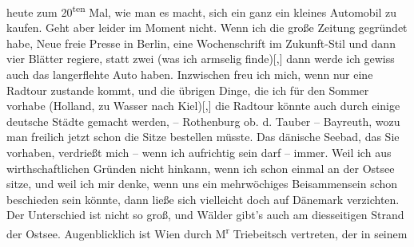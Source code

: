 \begin{ledgroupsized}[t]{13cm}
               heute zum 20\textsuperscript{ten} Mal, wie man es macht, sich ein ganz ein
               kleines Automobil zu kaufen. Geht aber leider im Moment nicht. Wenn ich die große
               Zeitung gegründet habe, Neue freie Presse in Berlin, eine Wochenschrift im Zukunft-Stil und dann vier Blätter regiere, statt zwei (was
               ich armselig finde){[},{]} dann werde ich gewiss auch das langerflehte
               Auto haben. Inzwischen freu ich mich, wenn nur eine Radtour zustande kommt, und die
               übrigen Dinge, die ich für den Sommer vorhabe (Holland, zu Wasser nach Kiel){[},{]} die Radtour könnte auch durch einige deutsche
               Städte gemacht werden, – Rothenburg ob. d. Tauber
               – Bayreuth, wozu man freilich jetzt schon die
               Sitze bestellen müsste. Das dänische Seebad, das
               Sie vorhaben, verdrießt mich – wenn ich aufrichtig sein darf – immer. Weil ich {\dotstwo} aus wirthschaftlichen Gründen {\dotstwo} nicht hinkann, wenn ich schon einmal an der Ostsee sitze, und weil ich mir denke, wenn uns ein mehrwöchiges
               Beisammensein schon beschieden sein könnte, dann ließe sich vielleicht doch auf Dänemark verzichten. Der Unterschied ist nicht
               so groß, und Wälder gibt's auch am diesseitigen Strand der Ostsee. \pend
           \pstart
           Augenblicklich ist Wien durch M\textsuperscript{r}{ }Triebeitsch vertreten, der in seinem \label{K_L03416-11v}
\end{ledgroupsized}
